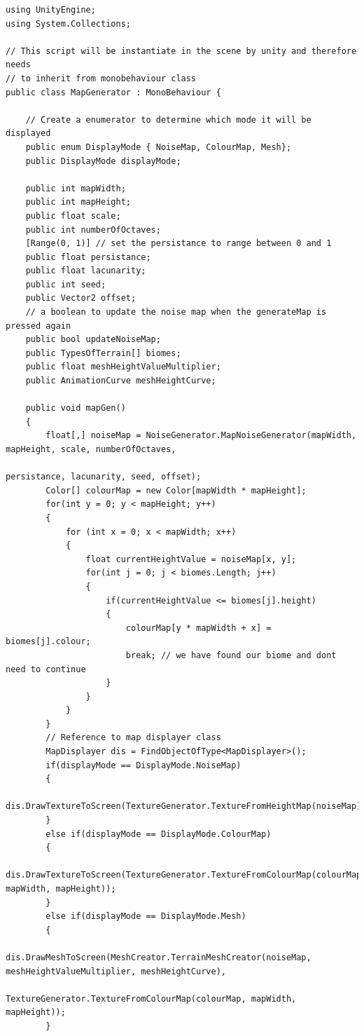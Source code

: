 \documentclass[a4paper,12pt]{book}
\begin{document}
\begin{lstlisting}
using UnityEngine;
using System.Collections;

// This script will be instantiate in the scene by unity and therefore needs
// to inherit from monobehaviour class
public class MapGenerator : MonoBehaviour {

    // Create a enumerator to determine which mode it will be displayed
    public enum DisplayMode { NoiseMap, ColourMap, Mesh};
    public DisplayMode displayMode;

    public int mapWidth;
    public int mapHeight;
    public float scale;
    public int numberOfOctaves;
    [Range(0, 1)] // set the persistance to range between 0 and 1
    public float persistance;
    public float lacunarity;
    public int seed;
    public Vector2 offset;
    // a boolean to update the noise map when the generateMap is pressed again
    public bool updateNoiseMap;
    public TypesOfTerrain[] biomes;
    public float meshHeightValueMultiplier;
    public AnimationCurve meshHeightCurve;

    public void mapGen()
    {
        float[,] noiseMap = NoiseGenerator.MapNoiseGenerator(mapWidth, mapHeight, scale, numberOfOctaves, 
                                                             persistance, lacunarity, seed, offset);
        Color[] colourMap = new Color[mapWidth * mapHeight];
        for(int y = 0; y < mapHeight; y++)
        {
            for (int x = 0; x < mapWidth; x++)
            {
                float currentHeightValue = noiseMap[x, y];
                for(int j = 0; j < biomes.Length; j++)
                {
                    if(currentHeightValue <= biomes[j].height)
                    {
                        colourMap[y * mapWidth + x] = biomes[j].colour;
                        break; // we have found our biome and dont need to continue
                    }
                } 
            }
        }
        // Reference to map displayer class
        MapDisplayer dis = FindObjectOfType<MapDisplayer>();
        if(displayMode == DisplayMode.NoiseMap)
        {
            dis.DrawTextureToScreen(TextureGenerator.TextureFromHeightMap(noiseMap));
        }
        else if(displayMode == DisplayMode.ColourMap)
        {
            dis.DrawTextureToScreen(TextureGenerator.TextureFromColourMap(colourMap, mapWidth, mapHeight));
        }
        else if(displayMode == DisplayMode.Mesh)
        {
            dis.DrawMeshToScreen(MeshCreator.TerrainMeshCreator(noiseMap, meshHeightValueMultiplier, meshHeightCurve), 
                                                TextureGenerator.TextureFromColourMap(colourMap, mapWidth, mapHeight));
        }
        

\end{lstlisting}
\end{document}
